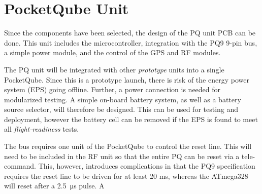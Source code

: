\section{PocketQube Unit}

Since the components have been selected, the design of the PQ unit PCB can be done. This unit includes the microcontroller, integration with the PQ9 9-pin bus, a simple power module, and the control of the GPS and RF modules.

The PQ unit will be integrated with other \textit{prototype} units into a single PocketQube. Since this is a prototype launch, there is risk of the energy power system (EPS) going offline. Further, a power connection is needed for modularized testing. A simple on-board battery system, as well as a battery source selector, will therefore be designed. This can be used for testing and deployment, however the battery cell can be removed if the EPS is found to meet all \textit{flight-readiness} tests.

The bus requires one unit of the PocketQube to control the reset line. This will need to be included in the RF unit so that the entire PQ can be reset via a tele-command. This, however, introduces complications in that the PQ9 specification requires the reset line to be driven for at least 20 ms, whereas the ATmega328 will reset after a \SI{2.5}{\micro \second} pulse. A 